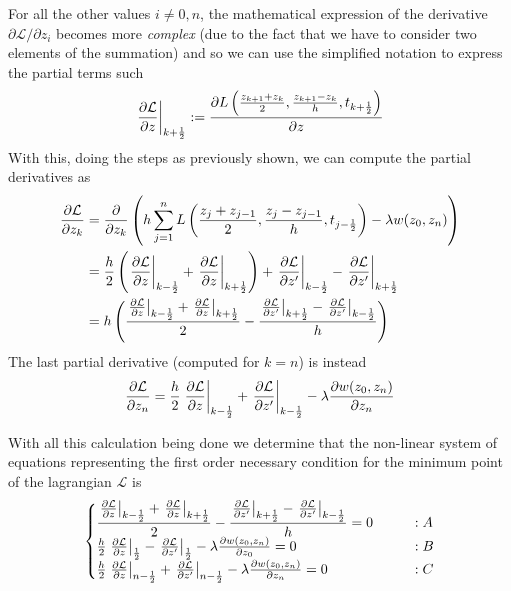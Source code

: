 	
	For all the other values $i\neq0,n$, the mathematical expression of the derivative $\partial\mathcal L   / \partial z_i$ becomes more \textit{complex} (due to the fact that we have to consider two elements of the summation) and so we can use the simplified notation to express the partial terms such
	\[ \left. \frac{\partial \mathcal L  }{\partial z} \right|_{k + \frac 1 2} :=  \frac{\partial L \left( \frac{z_{k+1}+z_k}2, \frac{z_{k+1}-z_k}h, t_{k+\frac 1 2} \right)}{\partial z} \]
	With this, doing the steps as previously shown, we can compute the partial derivatives as
	\begin{align*}
		\frac{\partial \mathcal L  }{\partial z_k} &= \frac{\partial }{\partial z_k} \left(h \sum_{j=1}^{n} L  \left(\frac{z_j + z_{j-1}}{2},  \frac{z_j - z_{j-1}}{h}  , t_{j-\frac 1 2}   \right) - \lambda w(z_0,z_n) \right) \\
		& = \frac h 2 \left( \left. \frac{\partial \mathcal L  }{\partial z} \right|_{k - \frac 1 2} + \left. \frac{\partial \mathcal L  }{\partial z} \right|_{k + \frac 1 2}  \right) + \left. \frac{\partial \mathcal L  }{\partial z'} \right|_{k - \frac 1 2} - \left. \frac{\partial \mathcal L  }{\partial z'} \right|_{k + \frac 1 2} \\
		& = h \left(  \frac{\left. \frac{\partial \mathcal L  }{\partial z} \right|_{k - \frac 1 2} + \left. \frac{\partial \mathcal L  }{\partial z} \right|_{k + \frac 1 2}}{2} - \frac{\left. \frac{\partial \mathcal L  }{\partial z'} \right|_{k + \frac 1 2} - \left. \frac{\partial \mathcal L  }{\partial z'} \right|_{k - \frac 1 2}}{h} \right)
	\end{align*}	
	The last partial derivative (computed for $k=n$) is instead
	\[ \frac{\partial \mathcal L  }{\partial z_n} = \frac h 2 \left. \frac{\partial \mathcal L  }{\partial z} \right|_{k - \frac 1 2} + \left. \frac{\partial \mathcal L  }{\partial z'} \right|_{k - \frac 1 2} - \lambda \frac{\partial w(z_0,z_n)}{\partial z_n}\]
	
	With all this calculation being done we determine that the non-linear system of equations representing the first order necessary condition for the minimum point of the lagrangian $\mathcal L  $ is
	\[\begin{cases}
		\dfrac{\left. \frac{\partial \mathcal L  }{\partial z} \right|_{k - \frac 1 2} + \left. \frac{\partial \mathcal L  }{\partial z} \right|_{k + \frac 1 2}}{2} - \dfrac{\left. \frac{\partial \mathcal L  }{\partial z'} \right|_{k + \frac 1 2} - \left. \frac{\partial \mathcal L  }{\partial z'} \right|_{k - \frac 1 2}}{h} = 0 \qquad & : A  \\
		\frac h 2 \left. \frac{\partial \mathcal L  }{\partial z} \right|_{\frac 1 2} - \left. \frac{\partial \mathcal L  }{\partial z'} \right|_{\frac 1 2} - \lambda \frac{\partial w(z_0,z_n)}{\partial z_0} = 0&:B\\
		\frac h 2 \left. \frac{\partial \mathcal L  }{\partial z} \right|_{n-\frac 1 2} + \left. \frac{\partial \mathcal L  }{\partial z'} \right|_{n-\frac 1 2} - \lambda \frac{\partial w(z_0,z_n)}{\partial z_n} = 0 &:C
	\end{cases}\]
	
